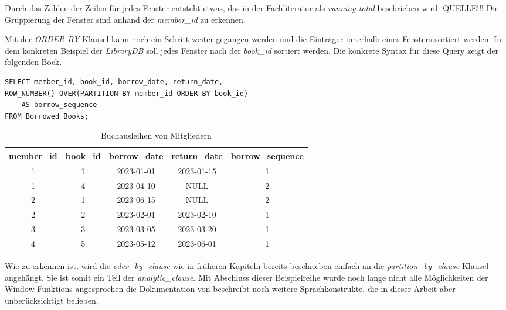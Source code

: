 Durch das Zählen der Zeilen für jedes Fenster entsteht etwas, das in der Fachliteratur
als \textit{running total} beschrieben wird. QUELLE!!! Die Gruppierung der
Fenster sind anhand der \textit{member\_id} zu erkennen.

Mit der \textit{ORDER BY} Klausel kann noch ein Schritt weiter gegangen werden
und die Einträger innerhalb eines Fensters sortiert werden. In dem konkreten Beispiel
der \textit{LibraryDB} soll jedes Fenster nach der \textit{book\_id} sortiert werden.
Die konkrete Syntax für diese Query zeigt der folgenden Bock.

\begin{lstlisting}
SELECT member_id, book_id, borrow_date, return_date,
ROW_NUMBER() OVER(PARTITION BY member_id ORDER BY book_id)
	AS borrow_sequence
FROM Borrowed_Books;
\end{lstlisting}
\begin{table}[h]
	\centering
	\begin{tabular}{|c|c|c|c|c|}
		\hline
		\textbf{member\_id} & \textbf{book\_id} & \textbf{borrow\_date} & \textbf{return\_date} & \textbf{borrow\_sequence} \\
		\hline
		1                   & 1                 & 2023-01-01            & 2023-01-15            & 1                         \\
		\hline
		1                   & 4                 & 2023-04-10            & NULL                  & 2                         \\
		\hline
		2                   & 1                 & 2023-06-15            & NULL                  & 2                         \\
		\hline
		2                   & 2                 & 2023-02-01            & 2023-02-10            & 1                         \\
		\hline
		3                   & 3                 & 2023-03-05            & 2023-03-20            & 1                         \\
		\hline
		4                   & 5                 & 2023-05-12            & 2023-06-01            & 1                         \\
		\hline
	\end{tabular}
	\caption{Buchausleihen von Mitgliedern}
	\label{tab:member_borrows}
\end{table}

Wie zu erkennen ist, wird die \textit{oder\_by\_clause} wie in früheren Kapiteln
bereits beschrieben einfach an die \textit{partition\_by\_clause} Klausel
angehängt. Sie ist somit ein Teil der \textit{analytic\_clause}. Mit Abschluss dieser
Beispielreihe wurde noch lange nicht alle Möglichkeiten der Window-Funktions angesprochen
die Dokumentation von \citet{oracle} beschreibt noch weitere Sprachkonstrukte, die
in dieser Arbeit aber unberücksichtigt belieben.

